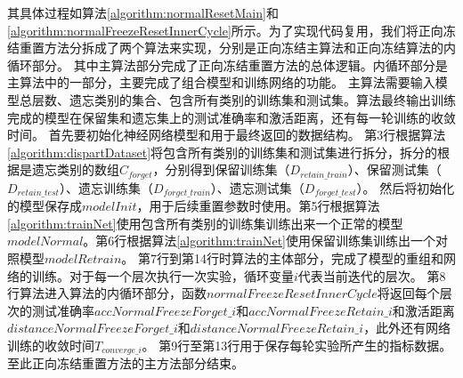 其具体过程如算法\ref{algorithm:normalResetMain}和\ref{algorithm:normalFreezeResetInnerCycle}所示。为了实现代码复用，我们将正向冻结重置方法分拆成了两个算法来实现，分别是正向冻结主算法和正向冻结算法的内循环部分。
其中主算法部分完成了正向冻结重置方法的总体逻辑。内循环部分是主算法中的一部分，主要完成了组合模型和训练网络的功能。
主算法需要输入模型总层数、遗忘类别的集合、包含所有类别的训练集和测试集。算法最终输出训练完成的模型在保留集和遗忘集上的测试准确率和激活距离，还有每一轮训练的收敛时间。
首先要初始化神经网络模型和用于最终返回的数据结构。
第3行根据算法\ref{algorithm:dispartDataset}将包含所有类别的训练集和测试集进行拆分，拆分的根据是遗忘类别的数组$C_{forget}$，分别得到保留训练集（$D_{retain\_train}$）、保留测试集（$D_{retain\_test}$）、遗忘训练集（$D_{forget\_train}$）、遗忘测试集（$D_{forget\_test}$）。
然后将初始化的模型保存成$modelInit$，用于后续重置参数时使用。第5行根据算法\ref{algorithm:trainNet}使用包含所有类别的训练集训练出来一个正常的模型$modelNormal$。第6行根据算法\ref{algorithm:trainNet}使用保留训练集训练出一个对照模型$modelRetrain$。
第7行到第14行时算法的主体部分，完成了模型的重组和网络的训练。对于每一个层次执行一次实验，循环变量$i$代表当前迭代的层次。
第8行算法进入算法的内循环部分，函数$𝑛𝑜𝑟𝑚𝑎𝑙𝐹𝑟𝑒𝑒𝑧𝑒𝑅𝑒𝑠𝑒𝑡𝐼𝑛𝑛𝑒𝑟𝐶𝑦𝑐𝑙𝑒$将返回每个层次的测试准确率$accNormalFreezeForget\_i$和$accNormalFreezeRetain\_i$和激活距离$distanceNormalFreezeForget\_i$和$distanceNormalFreezeRetain\_i$，此外还有网络训练的收敛时间$T_{converge\_i}$。
第9行至第13行用于保存每轮实验所产生的指标数据。至此正向冻结重置方法的主方法部分结束。
